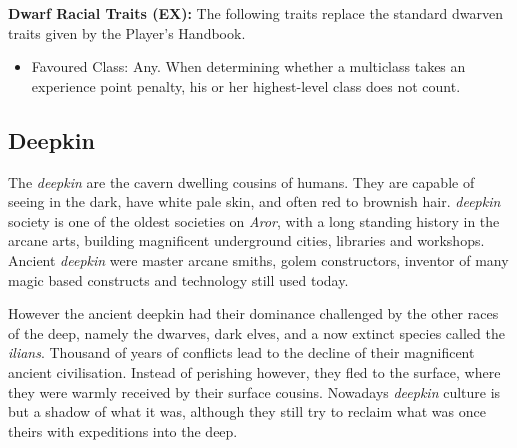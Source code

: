 \begin{35e}
  \textbf{Dwarf Racial Traits (EX):} The following traits replace the standard
  dwarven traits given by the Player's Handbook.
  \begin{itemize}[noitemsep]
    \item Favoured Class: Any. When determining whether a multiclass takes an
    experience point penalty, his or her highest-level class does not count.
  \end{itemize}
\end{35e}

\subsection*{Deepkin}



The \emph{deepkin} are the cavern dwelling cousins of humans. They are capable
of seeing in the dark, have white pale skin, and often red to brownish hair.
\emph{deepkin} society is one of the oldest societies on \emph{Aror}, with a
long standing history in the arcane arts, building magnificent underground
cities, libraries and workshops. Ancient \emph{deepkin} were master arcane
smiths, golem constructors, inventor of many magic based constructs and
technology still used today.

However the ancient deepkin had their dominance challenged by the other races
of the deep, namely the dwarves, dark elves, and a now extinct species called
the \emph{ilians}. Thousand of years of conflicts lead to the decline of their
magnificent ancient civilisation. Instead of perishing however, they fled to
the surface, where they were warmly received by their surface cousins. Nowadays
\emph{deepkin} culture is but a shadow of what it was, although they still try
to reclaim what was once theirs with expeditions into the deep.

